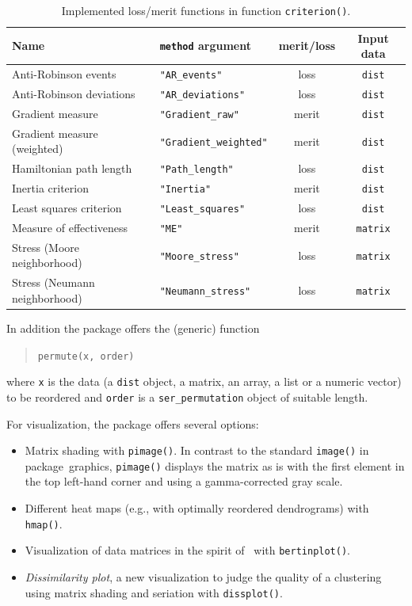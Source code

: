 \documentclass[fleqn, a4paper]{article}
\newcommand{\strong}[1]{{\normalfont\fontseries{b}\selectfont #1}}
\newcommand{\func}[1]{\mbox{\texttt{#1()}}}
\newcommand{\code}[1]{\mbox{\texttt{#1}}}
\newcommand{\pkg}[1]{\strong{#1}}
\begin{document}
\begin{table}[t]
\centering
\begin{tabular}{llcc}
        \hline
        Name & \code{method} argument & merit/loss & Input data \\
        \hline
        Anti-Robinson events& \code{"AR\_events"} & 
loss & \code{dist} \\
        Anti-Robinson deviations& \code{"AR\_deviations"} & 
loss & \code{dist} \\
        Gradient measure& \code{"Gradient\_raw"} & 
merit & \code{dist} \\
        Gradient measure (weighted)& \code{"Gradient\_weighted"} & 
merit & \code{dist} \\
        Hamiltonian path length & \code{"Path\_length"} & loss & \code{dist} \\
        Inertia criterion& \code{"Inertia"} & merit & \code{dist} \\
        Least squares criterion& \code{"Least\_squares"} & loss & \code{dist} \\
        Measure of effectiveness& \code{"ME"} & 
merit & \code{matrix} \\
        Stress (Moore neighborhood)& \code{"Moore\_stress"} & 
loss & \code{matrix} \\
        Stress (Neumann neighborhood)& \code{"Neumann\_stress"} & 
loss & \code{matrix} \\
        \hline
    \end{tabular}
    \caption{Implemented loss/merit functions in function \func{criterion}.}
\label{tab:criteria}
\end{table}

In addition the package offers the (generic) function
\begin{quotation}
\code{permute(x, order)} 
\end{quotation}
where \code{x} is the data (a \code{dist} object, a matrix, an
array, a list or a numeric vector) to be reordered and \code{order} is a
\code{ser\_permutation} object of suitable length. 

For visualization, the package offers several options:
\begin{itemize}
\item Matrix shading with \func{pimage}. In contrast to the 
        standard \func{image} in package~\pkg{graphics}, \func{pimage}
        displays the matrix as is with the first element in the top
        left-hand corner and using a gamma-corrected gray scale.

\item Different heat maps (e.g., with optimally reordered
    dendrograms) with \func{hmap}.

\item Visualization of data matrices in the spirit 
of~\cite{seriation:Bertin:1981} with \func{bertinplot}.

\item \emph{Dissimilarity plot}, a new visualization to judge the
    quality of a clustering using matrix shading 
    and seriation with \func{dissplot}.
\end{itemize}
\end{document}
